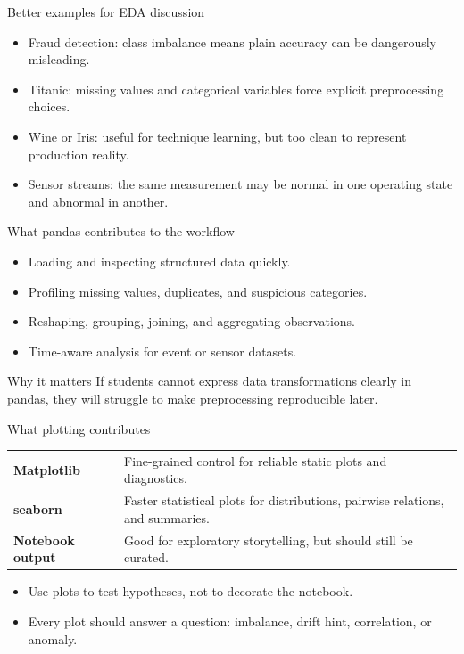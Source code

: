 \begin{frame}{Better examples for EDA discussion}
\begin{itemize}
\item Fraud detection: class imbalance means plain accuracy can be dangerously misleading.
\item Titanic: missing values and categorical variables force explicit preprocessing choices.
\item Wine or Iris: useful for technique learning, but too clean to represent production reality.
\item Sensor streams: the same measurement may be normal in one operating state and abnormal in another.
\end{itemize}
\coursefooter
\end{frame}

\begin{frame}{What pandas contributes to the workflow}
\begin{itemize}
\item Loading and inspecting structured data quickly.
\item Profiling missing values, duplicates, and suspicious categories.
\item Reshaping, grouping, joining, and aggregating observations.
\item Time-aware analysis for event or sensor datasets.
\end{itemize}
\begin{block}{Why it matters}
If students cannot express data transformations clearly in pandas, they will struggle to make preprocessing reproducible later.
\end{block}
\coursefooter
\end{frame}

\begin{frame}{What plotting contributes}
\begin{tabularx}{\textwidth}{>{\bfseries}l X}
Matplotlib & Fine-grained control for reliable static plots and diagnostics. \\
seaborn & Faster statistical plots for distributions, pairwise relations, and summaries. \\
Notebook output & Good for exploratory storytelling, but should still be curated. \\
\end{tabularx}
\vspace{0.6em}
\begin{itemize}
\item Use plots to test hypotheses, not to decorate the notebook.
\item Every plot should answer a question: imbalance, drift hint, correlation, or anomaly.
\end{itemize}
\coursefooter
\end{frame}

